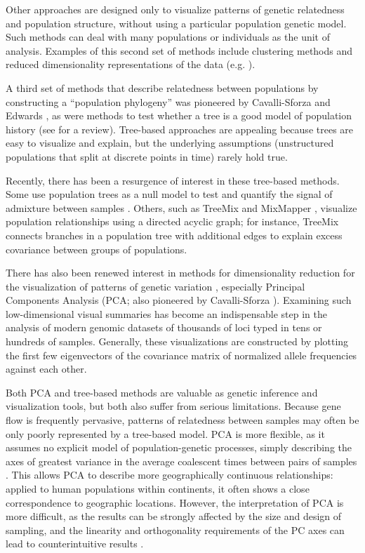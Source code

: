 \documentclass[10pt,letterpaper]{article}
\begin{document}
Other approaches are designed only to visualize patterns of genetic relatedness and population structure,
without using a particular population genetic model.
Such methods can deal with many populations or individuals as the unit of analysis. 
Examples of this second set of methods include clustering methods \cite{STRUCTURE, ADMIXTURE, FINESTRUCTURE} 
and reduced dimensionality representations of the data (e.g. \cite{cavallisforza1994, Patterson2006, price2006eigenstrat}).  

A third set of methods that describe relatedness between populations by constructing a ``population phylogeny''
was pioneered by Cavalli-Sforza and Edwards \cite{cavallisforza_edwards1967}, 
as were methods to test whether a tree is a good model of population history \cite{CavalliSforza1975} (see \cite{Felsenstein1982} for a review).
Tree-based approaches are appealing because trees are easy to visualize and explain,
but the underlying assumptions (unstructured populations that split at discrete points in time)
rarely hold true.
 
Recently, there has been a resurgence of interest in these tree-based methods.  
Some use population trees as a null model to test and quantify the signal of admixture between samples \cite{reich_india_2009}.  
Others, such as TreeMix \cite{Treemix} and MixMapper \cite{lipson_mixmapper_2013}, 
visualize population relationships using a directed acyclic graph;
for instance, TreeMix connects branches in a population tree with additional edges
to explain excess covariance between groups of populations.

There has also been renewed interest in methods for dimensionality reduction
for the visualization of patterns of genetic variation \cite{Patterson2006},
especially Principal Components Analysis
(PCA; also pioneered by Cavalli-Sforza \cite{menozzi1978synthetic}). 
Examining such low-dimensional visual summaries has become an indispensable step in
the analysis of modern genomic datasets of thousands of loci typed in tens or hundreds of samples.
Generally, these visualizations are constructed by plotting the first few eigenvectors of the covariance matrix
of normalized allele frequencies against each other.

Both PCA and tree-based methods are valuable as genetic inference and visualization tools, but both also suffer from serious limitations.  
Because gene flow is frequently pervasive, patterns of relatedness between samples may often be only poorly represented by a tree-based model.  
PCA is more flexible, as it assumes no explicit model of population-genetic processes, 
simply describing the axes of greatest variance in the average coalescent times between pairs of samples \cite{mcvean_genealogical_2009}. 
This allows PCA to describe more geographically continuous relationships: 
applied to human populations within continents, it often shows a close correspondence to geographic locations\cite{novembre_genes_2008,wang_quantitative_2012}.  
However, the interpretation of PCA is more difficult, as the results can be strongly affected by the size and design of sampling, 
and the linearity and orthogonality requirements of the PC axes can lead to counterintuitive results \cite{novembre_interpreting_2008, Francois_2010_surfing, Frichot2012}.
\end{document}
